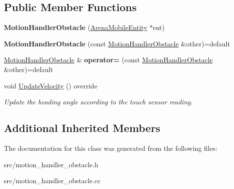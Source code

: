 \subsection*{Public Member Functions}
\begin{DoxyCompactItemize}
\item 
{\bfseries Motion\+Handler\+Obstacle} (\hyperlink{classArenaMobileEntity}{Arena\+Mobile\+Entity} $\ast$ent)\hypertarget{classMotionHandlerObstacle_a372bbd2b587c47fd3535d7044a8e8938}{}\label{classMotionHandlerObstacle_a372bbd2b587c47fd3535d7044a8e8938}

\item 
{\bfseries Motion\+Handler\+Obstacle} (const \hyperlink{classMotionHandlerObstacle}{Motion\+Handler\+Obstacle} \&other)=default\hypertarget{classMotionHandlerObstacle_a4454a8e05721c4b0aabc263961ae5f8a}{}\label{classMotionHandlerObstacle_a4454a8e05721c4b0aabc263961ae5f8a}

\item 
\hyperlink{classMotionHandlerObstacle}{Motion\+Handler\+Obstacle} \& {\bfseries operator=} (const \hyperlink{classMotionHandlerObstacle}{Motion\+Handler\+Obstacle} \&other)=default\hypertarget{classMotionHandlerObstacle_a6678c9e294e30b6f932fa49919fe27ff}{}\label{classMotionHandlerObstacle_a6678c9e294e30b6f932fa49919fe27ff}

\item 
void \hyperlink{classMotionHandlerObstacle_ad41e6be12c163937f5ccab36c4e35be8}{Update\+Velocity} () override\hypertarget{classMotionHandlerObstacle_ad41e6be12c163937f5ccab36c4e35be8}{}\label{classMotionHandlerObstacle_ad41e6be12c163937f5ccab36c4e35be8}

\begin{DoxyCompactList}\small\item\em Update the heading angle according to the touch sensor reading. \end{DoxyCompactList}\end{DoxyCompactItemize}
\subsection*{Additional Inherited Members}


The documentation for this class was generated from the following files\+:\begin{DoxyCompactItemize}
\item 
src/motion\+\_\+handler\+\_\+obstacle.\+h\item 
src/motion\+\_\+handler\+\_\+obstacle.\+cc\end{DoxyCompactItemize}
